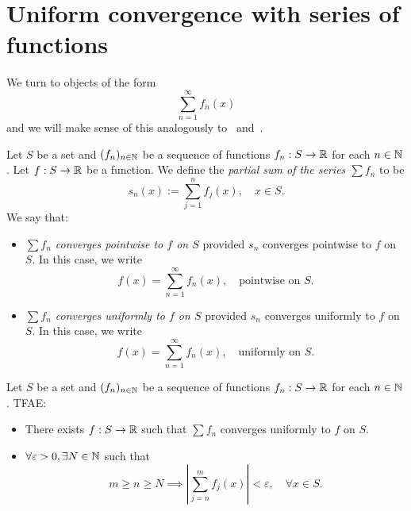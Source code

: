 \section{Uniform convergence with series of functions}
\label{sec:unif_fun_series}
We turn to objects of the form
\[
\sum_{n=1}^\infty f_n(x)
\]
and we will make sense of this analogously to~ and~.
\begin{defn}
	\label{defn:series_cvg}
	Let $S$ be a set and $(f_n)_{n\in\mathbb{N}}$ be a sequence of functions $f_n:S\to \mathbb{R}$ for each $n\in\mathbb{N}$. Let $f:S\to \mathbb{R}$ be a function. We define the \textit{partial sum of the series $\sum f_n$} to be
	\[
	s_n(x):= \sum_{j=1}^nf_j(x),\quad x \in S.
	\]
	We say that:
	\begin{itemize}
		\item \textit{$\sum f_n$ converges pointwise to $f$ on $S$} provided $s_n$ converges pointwise to $f$ on $S$. In this case, we write
		\[
		f(x) = \sum_{n=1}^\infty f_n(x),\quad\text{pointwise on }S.
		\]
		\item \textit{$\sum f_n$ converges uniformly to $f$ on $S$} provided $s_n$ converges uniformly to $f$ on $S$. In this case, we write
		\[
		f(x) = \sum_{n=1}^\infty f_n(x),\quad \text{uniformly on }S.
		\]
	\end{itemize}
\end{defn}
\begin{thm}
	\label{thm:unif_cauchy_series}
	Let $S$ be a set and $(f_n)_{n\in\mathbb{N}}$ be a sequence of functions $f_n:S\to \mathbb{R}$ for each $n\in \mathbb{N}$. TFAE:
	\begin{itemize}
		\item There exists $f:S\to \mathbb{R}$ such that $\sum f_n$ converges uniformly to $f$ on $S$.
		\item $\forall \varepsilon>0,\exists N\in\mathbb{N}$ such that
		\[
		m\ge n\ge N \implies \left|
		\sum_{j=n}^mf_j(x)
		\right|<\varepsilon,\quad \forall x \in S.
		\]
	\end{itemize}
\end{thm}
